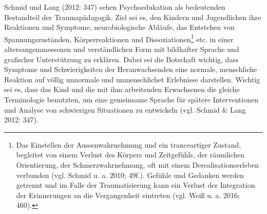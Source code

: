 Schmid und Lang (2012: 347) sehen Psychoedukation als bedeutenden Bestandteil der Traumap{\"a}dagogik. Ziel sei es, den Kindern und Jugendlichen ihre Reaktionen und Symptome, neurobiologische Abl{\"a}ufe, das Entstehen von Spannungszust{\"a}nden, K{\"o}rperreaktionen und Dissoziationen\footnote{Das Einstellen der Aussenwahrnehmung und ein tranceartiger Zustand, begleitet von einem Verlust des Körpers und Zeitgefühls, der räumlichen Orientierung, der Schmerzwahrnehmung, oft mit einem Derealisationserleben verbunden (vgl. Schmid u. a. 2010; 49f.). Gefühle und Gedanken werden getrennt und im Falle der Traumatisierung kann ein Verlust der Integration der Erinnerungen an die Vergangenheit eintreten (vgl. Weiß u. a. 2016; 460).} etc. in einer altersangemmessenen und verständlichen Form mit bildhafter Sprache und grafischer Unterstützung zu erklären. Dabei sei die Botschaft wichtig, dass Symptome und Schwierigkeiten der Heranwachsenden eine normale, menschliche Reaktion auf v{\"o}llig unnormale und unmenschlichet Erlebnisse darstellen. Wichtig sei es, dass das Kind und die mit ihm arbeitenden Erwachsenen die gleiche Terminologie benutzten, um eine gemeinsame Sprache für spätere Interventionen und Analyse von schwierigen Situationen zu entwickeln (vgl. Schmid \& Lang 2012: 347).

